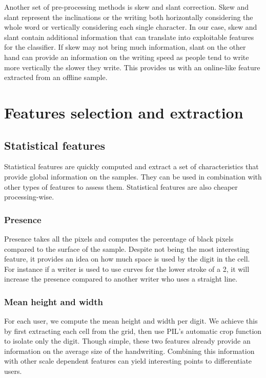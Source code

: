 \documentclass[a4paper]{article}
\begin{document}
{Another set of pre-processing methods is skew and slant correction. Skew and slant represent the inclinations or the writing both horizontally considering the whole word or vertically considering each single character. In our case, skew and slant contain additional information that can translate into exploitable features for the classifier. If skew may not bring much information, slant on the other hand can provide an information on the writing speed as people tend to write more vertically the slower they write. This provides us with an online-like feature extracted from an offline sample.
\pagebreak

\section{Features selection and extraction}
\subsection{Statistical features}

Statistical features are quickly computed and extract a set of characteristics that provide global information on the samples. They can be used in combination with other types of features to assess them. Statistical features are also cheaper processing-wise.

\subsubsection{Presence}
Presence takes all the pixels and computes the percentage of black pixels compared to the surface of the sample. Despite not being the most interesting feature, it provides an idea on how much space is used by the digit in the cell. For instance if a writer is used to use curves for the lower stroke of a 2, it will increase the presence compared to another writer who uses a straight line.

\subsubsection{Mean height and width}
For each user, we compute the mean height and width per digit. We achieve this by first extracting each cell from the grid, then use PIL’s automatic crop function to isolate only the digit. Though simple, these two features already provide an information on the average size of the handwriting. Combining this information with other scale dependent features can yield interesting points to differentiate users.

}
\end{document}
